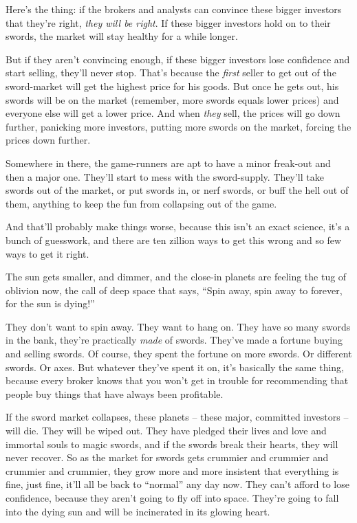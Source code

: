 Here's the thing: if the brokers and analysts can convince these
bigger investors that they're right, \emph{they will be right}. If
these bigger investors hold on to their swords, the market will
stay healthy for a while longer.

But if they aren't convincing enough, if these bigger investors
lose confidence and start selling, they'll never stop. That's
because the \emph{first} seller to get out of the sword-market will
get the highest price for his goods. But once he gets out, his
swords will be on the market (remember, more swords equals lower
prices) and everyone else will get a lower price. And when
\emph{they} sell, the prices will go down further, panicking more
investors, putting more swords on the market, forcing the prices
down further.

Somewhere in there, the game-runners are apt to have a minor
freak-out and then a major one. They'll start to mess with the
sword-supply. They'll take swords out of the market, or put swords
in, or nerf swords, or buff the hell out of them, anything to keep
the fun from collapsing out of the game.

And that'll probably make things worse, because this isn't an exact
science, it's a bunch of guesswork, and there are ten zillion ways
to get this wrong and so few ways to get it right.

The sun gets smaller, and dimmer, and the close-in planets are
feeling the tug of oblivion now, the call of deep space that says,
``Spin away, spin away to forever, for the sun is dying!''

They don't want to spin away. They want to hang on. They have so
many swords in the bank, they're practically \emph{made} of swords.
They've made a fortune buying and selling swords. Of course, they
spent the fortune on more swords. Or different swords. Or axes. But
whatever they've spent it on, it's basically the same thing,
because every broker knows that you won't get in trouble for
recommending that people buy things that have always been
profitable.

If the sword market collapses, these planets -- these major,
committed investors -- will die. They will be wiped out. They have
pledged their lives and love and immortal souls to magic swords,
and if the swords break their hearts, they will never recover. So
as the market for swords gets crummier and crummier and crummier
and crummier, they grow more and more insistent that everything is
fine, just fine, it'll all be back to ``normal'' any day now. They
can't afford to lose confidence, because they aren't going to fly
off into space. They're going to fall into the dying sun and will
be incinerated in its glowing heart.

